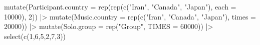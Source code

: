 \documentclass[
  bookmarksnumbered]{article}
\newenvironment{Shaded}{\begin{snugshade}}{\end{snugshade}}
\newcommand{\AttributeTok}[1]{\textcolor[rgb]{0.80,0.80,0.80}{#1}}
\newcommand{\DecValTok}[1]{\textcolor[rgb]{0.86,0.86,0.80}{#1}}
\newcommand{\FunctionTok}[1]{\textcolor[rgb]{0.94,0.94,0.56}{#1}}
\newcommand{\NormalTok}[1]{\textcolor[rgb]{0.80,0.80,0.80}{#1}}
\newcommand{\SpecialCharTok}[1]{\textcolor[rgb]{0.86,0.64,0.64}{#1}}
\newcommand{\StringTok}[1]{\textcolor[rgb]{0.80,0.58,0.58}{#1}}
\begin{document}
\begin{Shaded}
\begin{Highlighting}[]
  \FunctionTok{mutate}\NormalTok{(}\AttributeTok{Participant.country =} \FunctionTok{rep}\NormalTok{(}\FunctionTok{rep}\NormalTok{(}\FunctionTok{c}\NormalTok{(}\StringTok{"Iran"}\NormalTok{, }\StringTok{"Canada"}\NormalTok{, }\StringTok{"Japan"}\NormalTok{), }\AttributeTok{each =} \DecValTok{10000}\NormalTok{), }\DecValTok{2}\NormalTok{)) }\SpecialCharTok{|\textgreater{}}
  \FunctionTok{mutate}\NormalTok{(}\AttributeTok{Music.country =} \FunctionTok{rep}\NormalTok{(}\FunctionTok{c}\NormalTok{(}\StringTok{"Iran"}\NormalTok{, }\StringTok{"Canada"}\NormalTok{, }\StringTok{"Japan"}\NormalTok{), }\AttributeTok{times =} \DecValTok{20000}\NormalTok{)) }\SpecialCharTok{|\textgreater{}}
  \FunctionTok{mutate}\NormalTok{(}\AttributeTok{Solo.group =} \FunctionTok{rep}\NormalTok{(}\StringTok{"Group"}\NormalTok{, }\AttributeTok{TIMES =} \DecValTok{60000}\NormalTok{)) }\SpecialCharTok{|\textgreater{}}
  \FunctionTok{select}\NormalTok{(}\FunctionTok{c}\NormalTok{(}\DecValTok{1}\NormalTok{,}\DecValTok{6}\NormalTok{,}\DecValTok{5}\NormalTok{,}\DecValTok{2}\NormalTok{,}\DecValTok{7}\NormalTok{,}\DecValTok{3}\NormalTok{))}


\end{Highlighting}
\end{Shaded}
\end{document}
